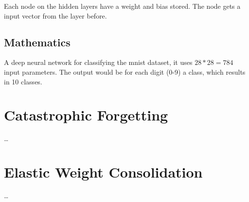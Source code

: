 Each node on the hidden layers have a weight and bias stored. The node gets a input vector from the layer before.

\subsection*{Mathematics}

A deep neural network for classifying the mnist dataset, it uses $28*28=784$ input parameters.
The output would be for each digit (0-9) a class, which results in 10 classes.


\section{Catastrophic Forgetting}

…

\section{Elastic Weight Consolidation}

…